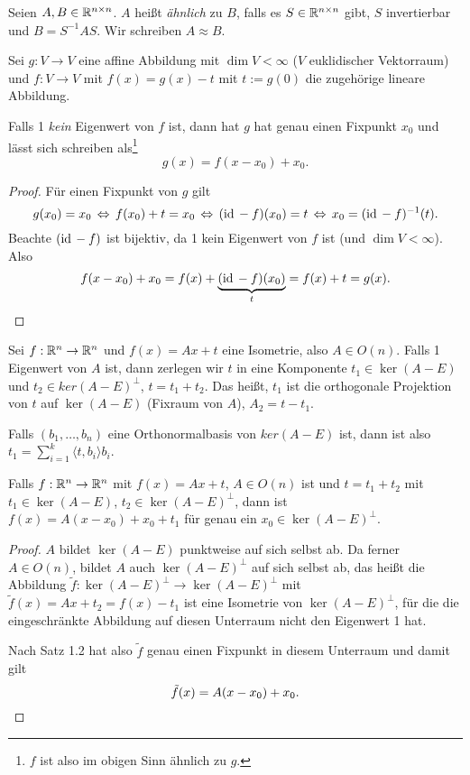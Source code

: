 \begin{mydef}[Ähnlichkeitsbegriff]
 Seien $A, B \in \mathbb{R}^{n \times n}$. $A$ heißt \emph{ähnlich} zu $B$, falls es $S \in \mathbb{R}^{n \times n}$ gibt, $S$ invertierbar und $B = S^{-1} A S$. Wir schreiben $A \approx B$.
\end{mydef}

\begin{thm}
 Sei $g: V \to V$ eine affine Abbildung mit $\dim V < \infty$ ($V$ euklidischer Vektorraum) und $f: V \to V$ mit $f(x) = g(x) - t$ mit $t := g(0)$ die zugehörige lineare Abbildung.
 
 Falls 1 \emph{kein} Eigenwert von $f$ ist, dann hat $g$ hat genau einen Fixpunkt $x_0$ und lässt sich schreiben als\footnote{$f$ ist also im obigen Sinn ähnlich zu $g$.}
 \[ g(x) = f(x-x_0) + x_0. \]
\end{thm}

\begin{proof}
 Für einen Fixpunkt von $g$ gilt
 \[ g(x_0) = x_0 \,\Leftrightarrow\, f(x_0) + t = x_0 \,\Leftrightarrow\, (\mathrm{id}\, - f)(x_0) = t \,\Leftrightarrow\, x_0 = (\mathrm{id}\, - f)^{-1}(t). \]
 Beachte $(\mathrm{id}\, -f)$ ist bijektiv, da 1 kein Eigenwert von $f$ ist (und $\dim V < \infty$). Also
 \[ f(x - x_0) + x_0 = f(x) + \underbrace{(\mathrm{id}\,-f)(x_0)}_{t} = f(x) + t = g(x). \]
\end{proof}

Sei $f:\mathbb{R}^n \to \mathbb{R}^n$ und $f(x) = Ax + t$ eine Isometrie, also $A \in O(n)$. Falls 1 Eigenwert von $A$ ist, dann zerlegen wir $t$ in eine Komponente $t_1 \in \ker(A-E)$ und $t_2 \in ker(A-E)^\bot$, $t = t_1 + t_2$. Das heißt, $t_1$ ist die orthogonale Projektion von $t$ auf $\ker(A-E)$ (Fixraum von $A$), $A_2 = t - t_1$.

\begin{bem}
 Falls $(b_1, \ldots, b_n)$ eine Orthonormalbasis von $ker(A-E)$ ist, dann ist also $t_1 = \sum_{i=1}^k \langle t, b_i \rangle b_i$.
\end{bem}

\begin{thm}
 Falls $f: \mathbb{R}^n \to \mathbb{R}^n$ mit $f(x) = Ax + t$, $A \in O(n)$ ist und $t = t_1 + t_2$ mit $t_1 \in \ker(A-E)$, $t_2 \in \ker(A-E)^\bot$, dann ist $f(x) = A(x-x_0) + x_0 + t_1$ für genau ein $x_0 \in \ker(A-E)^\bot$.
\end{thm}

\begin{proof}
 $A$ bildet $\ker(A-E)$ punktweise auf sich selbst ab. Da ferner $A \in O(n)$, bildet $A$ auch $\ker(A-E)^\bot$ auf sich selbst ab, das heißt die Abbildung $\tilde{f}: \ker(A-E)^\bot \to \ker(A-E)^\bot$ mit $\tilde{f}(x) = Ax + t_2 = f(x) - t_1$ ist eine Isometrie von $\ker(A-E)^\bot$, für die die eingeschränkte Abbildung auf diesen Unterraum nicht den Eigenwert 1 hat.
 
 Nach Satz 1.2 hat also $\tilde{f}$ genau einen Fixpunkt in diesem Unterraum und damit gilt
 \[ \tilde{f}(x) = A(x-x_0) + x_0. \qedhere \]
\end{proof}

